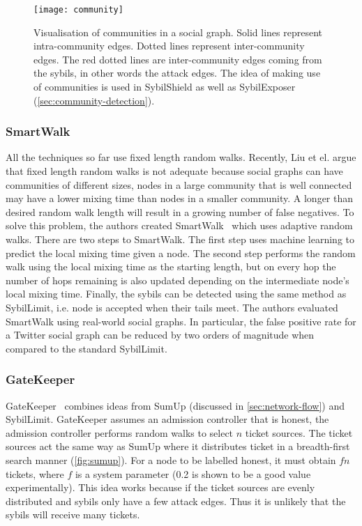 \begin{figure}
  \centering
  \texttt{[image: community]}
  \caption{Visualisation of communities in a social graph. Solid lines represent
    intra-community edges. Dotted lines represent inter-community edges. The red
    dotted lines are inter-community edges coming from the sybils, in other
    words the attack edges. The idea of making use of communities is used in
    SybilShield as well as SybilExposer
    (\autoref{sec:community-detection}).}
  \label{fig:community}
\end{figure}

\subsubsection{SmartWalk}
All the techniques so far use fixed length random walks. Recently, Liu et el.
argue that fixed length random walks is not adequate because social graphs can
have communities of different sizes, nodes in a large community that is well
connected may have a lower mixing time than nodes in a smaller community. A
longer than desired random walk length will result in a growing number of false
negatives. To solve this problem, the authors created
SmartWalk~\cite{liu2016smartwalk} which uses adaptive random walks. There are two
steps to SmartWalk. The first step uses machine learning to predict the local
mixing time given a node. The second step performs the random walk using the
local mixing time as the starting length, but on every hop the number of hops
remaining is also updated depending on the intermediate node's local mixing
time. Finally, the sybils can be detected using the same method as SybilLimit,
i.e. node is accepted when their tails meet. The authors evaluated SmartWalk
using real-world social graphs. In particular, the false positive rate for a
Twitter social graph can be reduced by two orders of magnitude when compared to
the standard SybilLimit.

\subsubsection{GateKeeper}
GateKeeper~\cite{tran2011optimal} combines ideas from SumUp (discussed in
\autoref{sec:network-flow}) and SybilLimit. GateKeeper assumes an admission
controller that is honest, the admission controller performs random walks to
select $n$ ticket sources. The ticket sources act the same way as SumUp where it
distributes ticket in a breadth-first search manner (\autoref{fig:sumup}). For a
node to be labelled honest, it must obtain $fn$ tickets, where $f$ is a system
parameter (0.2 is shown to be a good value experimentally). This idea works
because if the ticket sources are evenly distributed and sybils only have a few
attack edges. Thus it is unlikely that the sybils will receive many tickets.

